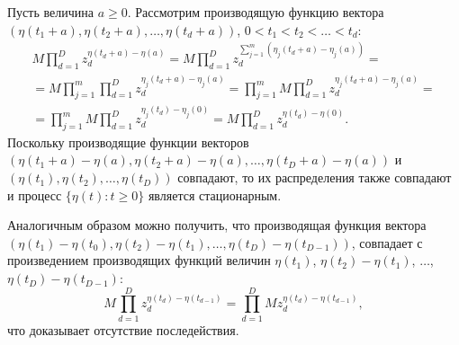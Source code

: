 \documentclass[14pt]{extarticle}
\begin{document}
Пусть величина $a\geqslant 0$. Рассмотрим производящую функцию вектора $(\eta(t_1+a), \eta(t_2+a), \ldots, \eta(t_d+a))$, $0<t_1<t_2<\ldots<t_d$:
\begin{multline*}
    M\prod_{d=1}^D z_d^{\eta(t_d + a)-\eta(a)} = M\prod_{d=1}^D z_d^{\sum_{j=1}^m(\eta_j(t_d + a)-\eta_j(a))} 
    =\\ =M\prod_{j=1}^m\prod_{d=1}^D z_d^{\eta_j(t_d + a)-\eta_j(a)} = \prod_{j=1}^m M\prod_{d=1}^D z_d^{\eta_j(t_d + a)-\eta_j(a)} 
    =\\= \prod_{j=1}^m M\prod_{d=1}^D z_d^{\eta_j(t_d)-\eta_j(0)} = 
      M\prod_{d=1}^D z_d^{\eta(t_d)-\eta(0)}.
\end{multline*}
Поскольку производящие функции векторов $(\eta(t_1+a)-\eta(a), \eta(t_2+a)-\eta(a), \ldots, \eta(t_D+a)-\eta(a))$ и $(\eta(t_1), \eta(t_2), \ldots, \eta(t_D))$ совпадают, то их распределения также совпадают и процесс $\{\eta(t)\colon t\geqslant 0\}$ является стационарным.

Аналогичным образом можно получить, что производящая функция вектора $(\eta(t_1)-\eta(t_0), \eta(t_2)-\eta(t_1), \ldots, \eta(t_D)-\eta(t_{D-1}))$, совпадает с произведением производящих функций величин $\eta(t_1)$, $\eta(t_2)-\eta(t_1)$, $\ldots$, $\eta(t_D)-\eta(t_{D-1})$:
\begin{equation*}
M\prod_{d=1}^D z_d^{\eta(t_d) -\eta(t_{d-1}) } = \prod_{d=1}^D M z_d^{\eta(t_d) -\eta(t_{d-1}) },
\end{equation*}
что доказывает отсутствие последействия.
\end{document}
